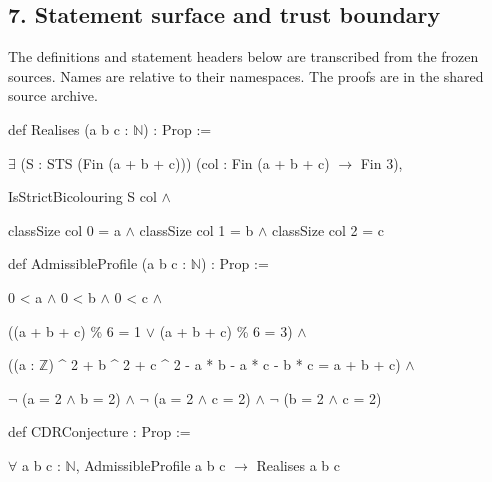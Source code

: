 \documentclass[english,11pt,a4paper]{article}
\begin{document}
\subsection{7. Statement surface and trust boundary}\label{statement-surface-and-trust-boundary}

The definitions and statement headers below are transcribed from the frozen sources. Names are relative to their namespaces. The proofs are in the shared source archive.

\begingroup\small\ttfamily\raggedright 
\noindent\hspace*{0.0em}def Realises (a b c : \(\mathbb N\)) : Prop :=\par
\noindent\hspace*{0.9em}\(\exists\) (S : STS (Fin (a + b + c))) (col : Fin (a + b + c) \(\to\) Fin 3),\par
\noindent\hspace*{1.8em}IsStrictBicolouring S col \(\land\)\par
\noindent\hspace*{2.7em}classSize col 0 = a \(\land\) classSize col 1 = b \(\land\) classSize col 2 = c\par
\noindent\hspace*{0.0em}\par
\noindent\hspace*{0.0em}def AdmissibleProfile (a b c : \(\mathbb N\)) : Prop :=\par
\noindent\hspace*{0.9em}0 < a \(\land\) 0 < b \(\land\) 0 < c \(\land\)\par
\noindent\hspace*{0.9em}((a + b + c) \% 6 = 1 \(\lor\) (a + b + c) \% 6 = 3) \(\land\)\par
\noindent\hspace*{0.9em}((a : \(\mathbb Z\)) \textasciicircum{} 2 + b \textasciicircum{} 2 + c \textasciicircum{} 2 - a * b - a * c - b * c = a + b + c) \(\land\)\par
\noindent\hspace*{0.9em}\(\neg\) (a = 2 \(\land\) b = 2) \(\land\) \(\neg\) (a = 2 \(\land\) c = 2) \(\land\) \(\neg\) (b = 2 \(\land\) c = 2)\par
\noindent\hspace*{0.0em}\par
\noindent\hspace*{0.0em}def CDRConjecture : Prop :=\par
\noindent\hspace*{0.9em}\(\forall\) a b c : \(\mathbb N\), AdmissibleProfile a b c \(\to\) Realises a b c\par
\end{document}
